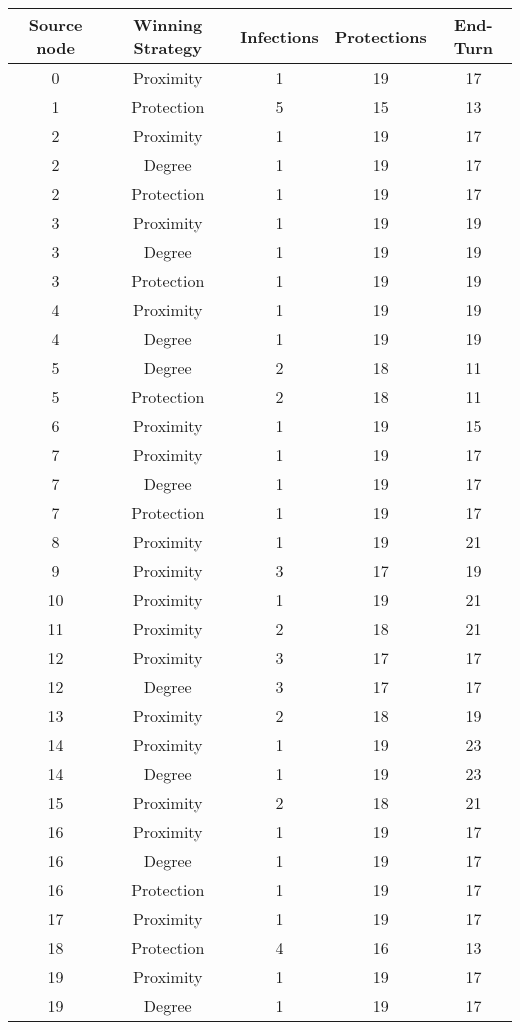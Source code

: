 \documentclass[results.tex]{subfiles}
\begin{document}
\begin{center}
  \begin{tabular}{| c || c | c | c | c |}
    \hline
    {\bfseries Source node} & {\bfseries Winning Strategy} & {\bfseries Infections} & {\bfseries Protections} & {\bfseries End-Turn} \\  %
    \hline\hline
    0 & Proximity & 1 & 19 & 17 \\
    \hline
    1 & Protection & 5 & 15 & 13 \\
    \hline
    2 & Proximity & 1 & 19 & 17 \\
    \hline
    2 & Degree & 1 & 19 & 17 \\
    \hline
    2 & Protection & 1 & 19 & 17 \\
    \hline
    3 & Proximity & 1 & 19 & 19 \\
    \hline
    3 & Degree & 1 & 19 & 19 \\
    \hline
    3 & Protection & 1 & 19 & 19 \\
    \hline
    4 & Proximity & 1 & 19 & 19 \\
    \hline
    4 & Degree & 1 & 19 & 19 \\
    \hline
    5 & Degree & 2 & 18 & 11 \\
    \hline
    5 & Protection & 2 & 18 & 11 \\
    \hline
    6 & Proximity & 1 & 19 & 15 \\
    \hline
    7 & Proximity & 1 & 19 & 17 \\
    \hline
    7 & Degree & 1 & 19 & 17 \\
    \hline
    7 & Protection & 1 & 19 & 17 \\
    \hline
    8 & Proximity & 1 & 19 & 21 \\
    \hline
    9 & Proximity & 3 & 17 & 19 \\
    \hline
    10 & Proximity & 1 & 19 & 21 \\
    \hline
    11 & Proximity & 2 & 18 & 21 \\
    \hline
    12 & Proximity & 3 & 17 & 17 \\
    \hline
    12 & Degree & 3 & 17 & 17 \\
    \hline
    13 & Proximity & 2 & 18 & 19 \\
    \hline
    14 & Proximity & 1 & 19 & 23 \\
    \hline
    14 & Degree & 1 & 19 & 23 \\
    \hline
    15 & Proximity & 2 & 18 & 21 \\
    \hline
    16 & Proximity & 1 & 19 & 17 \\
    \hline
    16 & Degree & 1 & 19 & 17 \\
    \hline
    16 & Protection & 1 & 19 & 17 \\
    \hline
    17 & Proximity & 1 & 19 & 17 \\
    \hline
    18 & Protection & 4 & 16 & 13 \\
    \hline
    19 & Proximity & 1 & 19 & 17 \\
    \hline
    19 & Degree & 1 & 19 & 17 \\
    \hline
  \end{tabular}
\end{center}
\end{document}
